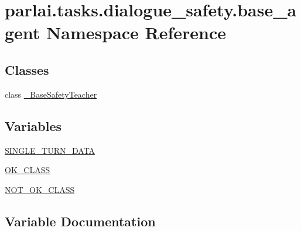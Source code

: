 \hypertarget{namespaceparlai_1_1tasks_1_1dialogue__safety_1_1base__agent}{}\section{parlai.\+tasks.\+dialogue\+\_\+safety.\+base\+\_\+agent Namespace Reference}
\label{namespaceparlai_1_1tasks_1_1dialogue__safety_1_1base__agent}
\subsection*{Classes}
\begin{DoxyCompactItemize}
\item 
class \hyperlink{classparlai_1_1tasks_1_1dialogue__safety_1_1base__agent_1_1__BaseSafetyTeacher}{\+\_\+\+Base\+Safety\+Teacher}
\end{DoxyCompactItemize}
\subsection*{Variables}
\begin{DoxyCompactItemize}
\item 
\hyperlink{namespaceparlai_1_1tasks_1_1dialogue__safety_1_1base__agent_a54febd4edac5e81542c9319f1c23e99a}{S\+I\+N\+G\+L\+E\+\_\+\+T\+U\+R\+N\+\_\+\+D\+A\+TA}
\item 
\hyperlink{namespaceparlai_1_1tasks_1_1dialogue__safety_1_1base__agent_a77ce74782582df77e79b2979a6649475}{O\+K\+\_\+\+C\+L\+A\+SS}
\item 
\hyperlink{namespaceparlai_1_1tasks_1_1dialogue__safety_1_1base__agent_a133f5ee786a1991bf51aa4bb81a950a4}{N\+O\+T\+\_\+\+O\+K\+\_\+\+C\+L\+A\+SS}
\end{DoxyCompactItemize}


\subsection{Variable Documentation}
\mbox{\label{namespaceparlai_1_1tasks_1_1dialogue__safety_1_1base__agent_a133f5ee786a1991bf51aa4bb81a950a4}} 
